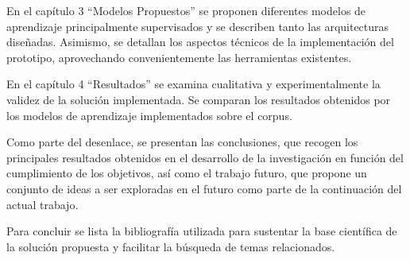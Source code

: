En el capítulo 3 “Modelos Propuestos” se proponen diferentes modelos de aprendizaje principalmente supervisados y se describen tanto las arquitecturas diseñadas. Asimismo, se
detallan los aspectos técnicos de la implementación del prototipo, aprovechando convenientemente las herramientas existentes.

En el capítulo 4 “Resultados” se examina cualitativa y experimentalmente la validez de la solución implementada. Se comparan los resultados obtenidos por los modelos de aprendizaje implementados sobre el corpus.

Como parte del desenlace, se presentan las conclusiones, que recogen los principales resultados obtenidos en el desarrollo de la investigación en función del cumplimiento de los objetivos, así como el trabajo futuro, que propone un conjunto de ideas a ser exploradas en el futuro como parte de la continuación del actual trabajo.

Para concluir se lista la bibliografía utilizada para sustentar la base científica de la solución propuesta y facilitar la búsqueda de temas relacionados.

